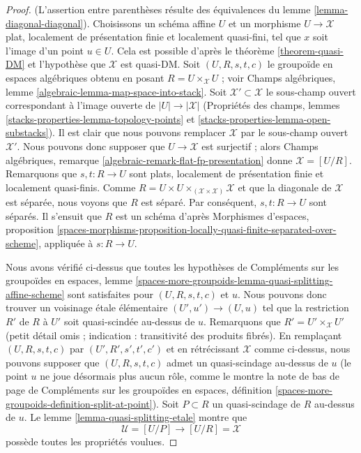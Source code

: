 \begin{proof}
(L'assertion entre parenth\`eses r\'esulte des \'equivalences du
lemme \ref{lemma-diagonal-diagonal}).
Choisissons un sch\'ema affine $U$ et un morphisme $U \to \mathcal{X}$
plat, localement de pr\'esentation finie et localement quasi-fini, tel que $x$
soit l'image d'un point $u \in U$. Cela est possible d'apr\`es
le th\'eor\`eme \ref{theorem-quasi-DM} et l'hypoth\`ese que $\mathcal{X}$
est quasi-DM. Soit $(U, R, s, t, c)$ le groupo\"ide en espaces alg\'ebriques
obtenu en posant $R = U \times_\mathcal{X} U$ ; voir
Champs alg\'ebriques, lemme \ref{algebraic-lemma-map-space-into-stack}.
Soit $\mathcal{X}' \subset \mathcal{X}$ le sous-champ ouvert correspondant
\`a l'image ouverte de $|U| \to |\mathcal{X}|$
(Propri\'et\'es des champs, lemmes
\ref{stacks-properties-lemma-topology-points} et
\ref{stacks-properties-lemma-open-substacks}).
Il est clair que nous pouvons remplacer $\mathcal{X}$ par le sous-champ ouvert $\mathcal{X}'$.
Nous pouvons donc supposer que $U \to \mathcal{X}$ est surjectif ; alors
Champs alg\'ebriques, remarque \ref{algebraic-remark-flat-fp-presentation}
donne $\mathcal{X} = [U/R]$.
Remarquons que $s, t : R \to U$ sont plats, localement de pr\'esentation finie
et localement quasi-finis.
Comme $R = U \times U \times_{(\mathcal{X} \times \mathcal{X})} \mathcal{X}$
et que la diagonale de $\mathcal{X}$ est s\'epar\'ee, nous voyons que
$R$ est s\'epar\'e. Par cons\'equent, $s, t : R \to U$ sont s\'epar\'es. Il s'ensuit
que $R$ est un sch\'ema d'apr\`es
Morphismes d'espaces, proposition
\ref{spaces-morphisms-proposition-locally-quasi-finite-separated-over-scheme},
appliqu\'ee \`a $s : R \to U$.

\medskip\noindent
Nous avons v\'erifi\'e ci-dessus que toutes les hypoth\`eses de
Compl\'ements sur les groupo\"ides en espaces, lemme
\ref{spaces-more-groupoids-lemma-quasi-splitting-affine-scheme}
sont satisfaites pour $(U, R, s, t, c)$ et $u$.
Nous pouvons donc trouver un voisinage \'etale \'el\'ementaire
$(U', u') \to (U, u)$ tel que la restriction $R'$ de $R$ \`a $U'$
soit quasi-scind\'ee au-dessus de $u$. Remarquons que $R' = U' \times_\mathcal{X} U'$
(petit d\'etail omis ; indication : transitivit\'e des produits fibr\'es).
En rempla\c{c}ant $(U, R, s, t, c)$ par $(U', R', s', t', c')$ et en r\'etr\'ecissant
$\mathcal{X}$ comme ci-dessus, nous pouvons supposer que $(U, R, s, t, c)$ admet
un quasi-scindage au-dessus de $u$ (le point $u$ ne joue d\'esormais plus
aucun r\^ole, comme le montre la note de bas de page de
Compl\'ements sur les groupo\"ides en espaces, d\'efinition
\ref{spaces-more-groupoids-definition-split-at-point}).
Soit $P \subset R$ un quasi-scindage de $R$ au-dessus de $u$.
Le lemme \ref{lemma-quasi-splitting-etale}
montre que
$$
\mathcal{U} = [U/P] \longrightarrow [U/R] = \mathcal{X}
$$
poss\`ede toutes les propri\'et\'es voulues.
\end{proof}

